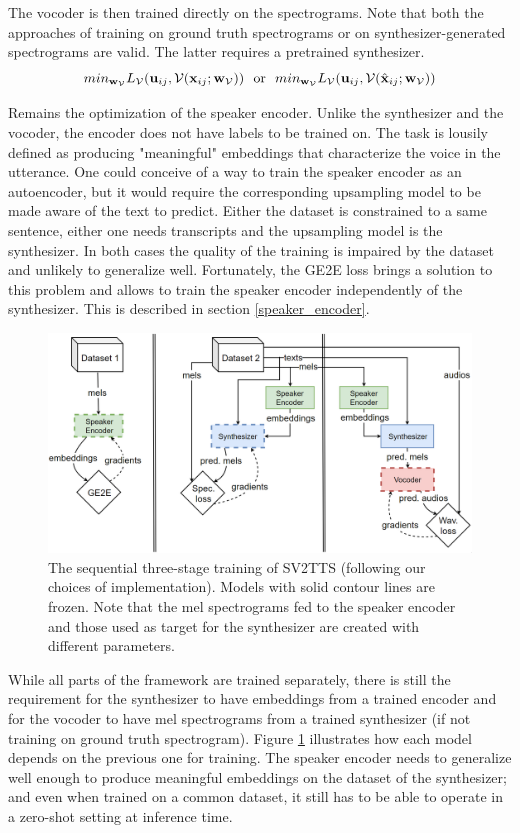 \documentclass[a4paper, oneside, 12pt, english]{article}
\begin{document}
The vocoder is then trained directly on the spectrograms. Note that both the approaches of training on ground truth spectrograms or on synthesizer-generated spectrograms are valid. The latter requires a pretrained synthesizer.
$$ min_{\vw_\voc} L_\voc(\vu_{ij}, \voc(\vx_{ij}; \vw_\voc)) \ \ \text{or} \ \ 
   min_{\vw_\voc} L_\voc(\vu_{ij}, \voc(\hat\vx_{ij}; \vw_\voc)) $$

Remains the optimization of the speaker encoder. Unlike the synthesizer and the vocoder, the encoder does not have labels to be trained on. The task is lousily defined as producing "meaningful" embeddings that characterize the voice in the utterance. One could conceive of a way to train the speaker encoder as an autoencoder, but it would require the corresponding upsampling model to be made aware of the text to predict. Either the dataset is constrained to a same sentence, either one needs transcripts and the upsampling model is the synthesizer. In both cases the quality of the training is impaired by the dataset and unlikely to generalize well. Fortunately, the GE2E loss \citep{GE2E} brings a solution to this problem and allows to train the speaker encoder independently of the synthesizer. This is described in section \ref{speaker_encoder}. 

\begin{figure}[h]
	\centering
	\includegraphics[width=\linewidth]{images/sv2tts_training.png}
	\caption{The sequential three-stage training of SV2TTS (following our choices of implementation). Models with solid contour lines are frozen. Note that the mel spectrograms fed to the speaker encoder and those used as target for the synthesizer are created with different parameters.}
	\label{sv2tts_training}
\end{figure}

While all parts of the framework are trained separately, there is still the requirement for the synthesizer to have embeddings from a trained encoder and for the vocoder to have mel spectrograms from a trained synthesizer (if not training on ground truth spectrogram). Figure \ref{sv2tts_training} illustrates how each model depends on the previous one for training. The speaker encoder needs to generalize well enough to produce meaningful embeddings on the dataset of the synthesizer; and even when trained on a common dataset, it still has to be able to operate in a zero-shot setting at inference time. 
\end{document}

